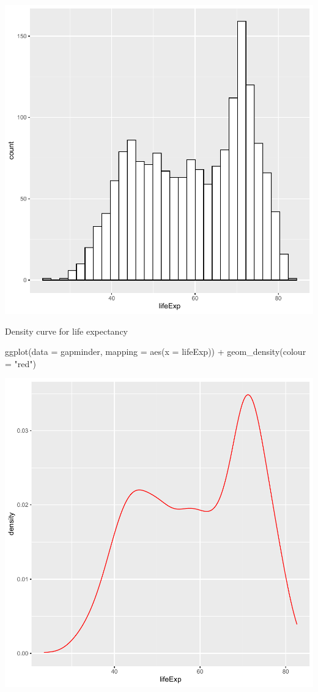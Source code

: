 \documentclass[
]{book}
\makeatletter
\newenvironment{Shaded}{\begin{snugshade}}{\end{snugshade}}
\newcommand{\AttributeTok}[1]{\textcolor[rgb]{0.61,0.61,0.61}{#1}}
\newcommand{\FunctionTok}[1]{\textcolor[rgb]{0,0,0}{#1}}
\newcommand{\NormalTok}[1]{#1}
\newcommand{\SpecialCharTok}[1]{\textcolor[rgb]{0,0,0}{#1}}
\newcommand{\StringTok}[1]{\textcolor[rgb]{0.5,0.5,0.5}{#1}}
\newenvironment{kframe}{%
\medskip{}
\setlength{\fboxsep}{.8em}
 \def\at@end@of@kframe{}%
 \ifinner\ifhmode%
  \def\at@end@of@kframe{\end{minipage}}%
  \begin{minipage}{\columnwidth}%
 \fi\fi%
 \def\FrameCommand##1{\hskip\@totalleftmargin \hskip-\fboxsep
 \colorbox{shadecolor}{##1}\hskip-\fboxsep
     \hskip-\linewidth \hskip-\@totalleftmargin \hskip\columnwidth}%
 \MakeFramed {\advance\hsize-\width
   \@totalleftmargin\z@ \linewidth\hsize
   \@setminipage}}%
 {\par\unskip\endMakeFramed%
 \at@end@of@kframe}
\renewenvironment{Shaded}{\begin{kframe}}{\end{kframe}}
\makeatother
\begin{document}
\begin{center}\includegraphics[width=0.7\linewidth,keepaspectratio]{Multivariable_Data_Analysis_files/figure-latex/unnamed-chunk-78-1} \end{center}

Density curve for life expectancy

\begin{Shaded}
\begin{Highlighting}[]
\FunctionTok{ggplot}\NormalTok{(}\AttributeTok{data =}\NormalTok{ gapminder, }\AttributeTok{mapping =} \FunctionTok{aes}\NormalTok{(}\AttributeTok{x =}\NormalTok{ lifeExp)) }\SpecialCharTok{+} 
  \FunctionTok{geom\_density}\NormalTok{(}\AttributeTok{colour =} \StringTok{"red"}\NormalTok{)}
\end{Highlighting}
\end{Shaded}

\begin{center}\includegraphics[width=0.7\linewidth,keepaspectratio]{Multivariable_Data_Analysis_files/figure-latex/unnamed-chunk-79-1} \end{center}
\end{document}
